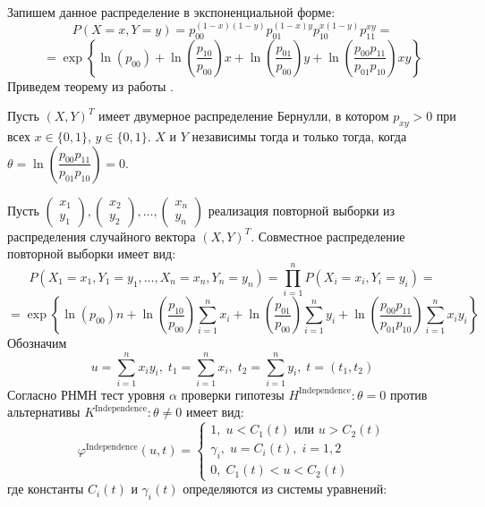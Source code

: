 Запишем данное распределение в экспоненциальной форме:
$$
P(X=x,Y=y)=p_{00}^{(1-x)(1-y)}p_{01}^{(1-x)y}
p_{10}^{x(1-y)}p_{11}^{xy}=
$$
$$=\exp \left\{\ln(p_{00}) + 
     \ln \left(\dfrac{p_{10}}{p_{00}}\right) x
    +  \ln \left(\dfrac{p_{01}}{p_{00}}\right) y +
     \ln\left(\dfrac{p_{00}p_{11}}{p_{01}p_{10}}\right) xy
 \right\}
$$
Приведем теорему из работы \cite{Dai2013}.
\begin{theorem}
    Пусть $(X,Y)^T$ имеет двумерное распределение Бернулли,
    в котором $p_{xy} > 0$ при всех
    $x \in \{0,1\}$, $y\in \{0,1\}$. $X$ и $Y$ независимы тогда и только тогда, когда
$\theta=\ln\left(\dfrac{p_{00}p_{11}}{p_{01}p_{10}}\right)=0$.
\end{theorem}
Пусть
    $
        \begin{pmatrix}
            x_1 \\
            y_1 
        \end{pmatrix},
        \begin{pmatrix}
            x_2 \\
            y_2
        \end{pmatrix}, \ldots,
        \begin{pmatrix}
            x_n \\
            y_n
        \end{pmatrix}
    $
    реализация повторной выборки из распределения случайного вектора $(X,Y)^T$.
    Совместное распределение повторной выборки имеет вид:
$$
    P(X_1=x_1,Y_1=y_1,\ldots,X_n=x_n,Y_n=y_n)
    =\prod_{i=1}^n P(X_i=x_i,Y_i=y_i) =
    $$
    $$
    =\exp \left\{ \ln(p_{00})n + 
        \ln \left(\dfrac{p_{10}}{p_{00}}\right) \sum_{i=1}^n x_i 
        +\ln \left(\dfrac{p_{01}}{p_{00}}\right) \sum_{i=1}^{n} y_i   +
        \ln\left(\dfrac{p_{00}p_{11}}{p_{01}p_{10}}\right) \sum_{i=1}^n x_i y_i 
     \right\}
    $$
    Обозначим 
    $$
    u = \sum_{i=1}^n x_i y_i,\;
    t_1 = \sum_{i=1}^n x_i,\;
    t_2 = \sum_{i=1}^n y_i, \; t=(t_1,t_2)$$
    Согласно \cite{Lehmann1986} РНМН тест уровня $\alpha$ проверки гипотезы $H^{\text{Independence}}: \theta = 0$ против альтернативы $K^{\text{Independence}}: \theta \neq 0$ 
    имеет вид:
    $$
    \varphi^{\text{Independence}}(u,t)=\begin{cases}
        1, \; u<C_1(t) \text{ или } u>C_2(t)\\
        \gamma_i, \; u=C_i(t), \; i=1,2\\
        0, \; C_1(t)<u<C_2(t)
    \end{cases}
    $$
    где константы $C_i(t)$ и $\gamma_i(t)$ определяются из системы уравнений:
